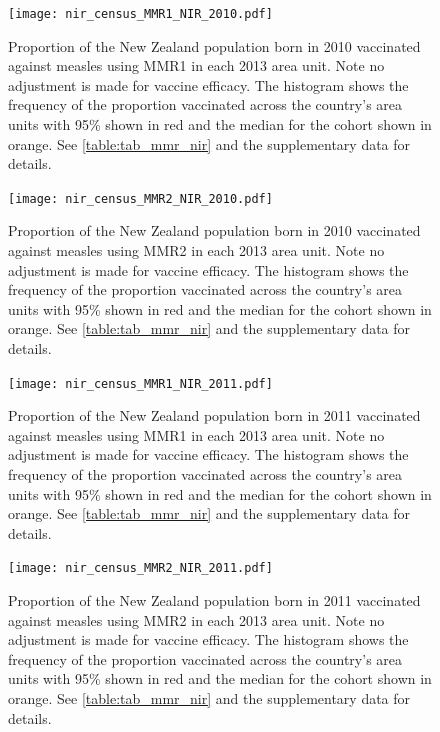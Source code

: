 \documentclass{article}
\begin{document}
\begin{figure}
\begin{center}
    \texttt{[image: nir\_census\_MMR1\_NIR\_2010.pdf]}
\end{center}
    \caption{Proportion of the New Zealand population born in 2010 vaccinated against measles using MMR1 in each 2013 area unit. Note no adjustment is made for vaccine efficacy. The histogram shows the frequency of the proportion vaccinated across the country's area units with 95\% shown in red and the median for the cohort shown in orange. See \autoref{table:tab_mmr_nir} and the supplementary data for details.}
\label{fig:fig12010}
\end{figure}


\begin{figure}
\begin{center}
    \texttt{[image: nir\_census\_MMR2\_NIR\_2010.pdf]}
 \end{center}
    \caption{Proportion of the New Zealand population born in 2010 vaccinated against measles using MMR2 in each 2013 area unit. Note no adjustment is made for vaccine efficacy. The histogram shows the frequency of the proportion vaccinated across the country's area units with 95\% shown in red and the median for the cohort shown in orange. See \autoref{table:tab_mmr_nir} and the supplementary data for details.}
\label{fig:fig22010}
\end{figure}


\begin{figure}
\begin{center}
    \texttt{[image: nir\_census\_MMR1\_NIR\_2011.pdf]}
 \end{center}
    \caption{Proportion of the New Zealand population born in 2011 vaccinated against measles using MMR1 in each 2013 area unit. Note no adjustment is made for vaccine efficacy. The histogram shows the frequency of the proportion vaccinated across the country's area units with 95\% shown in red and the median for the cohort shown in orange. See \autoref{table:tab_mmr_nir} and the supplementary data for details.}
\label{fig:fig12011}
\end{figure}


\begin{figure}
\begin{center}
    \texttt{[image: nir\_census\_MMR2\_NIR\_2011.pdf]}
 \end{center}
    \caption{Proportion of the New Zealand population born in 2011 vaccinated against measles using MMR2 in each 2013 area unit. Note no adjustment is made for vaccine efficacy. The histogram shows the frequency of the proportion vaccinated across the country's area units with 95\% shown in red and the median for the cohort shown in orange. See \autoref{table:tab_mmr_nir} and the supplementary data for details.}
\label{fig:fig22011}
\end{figure}
\end{document}
